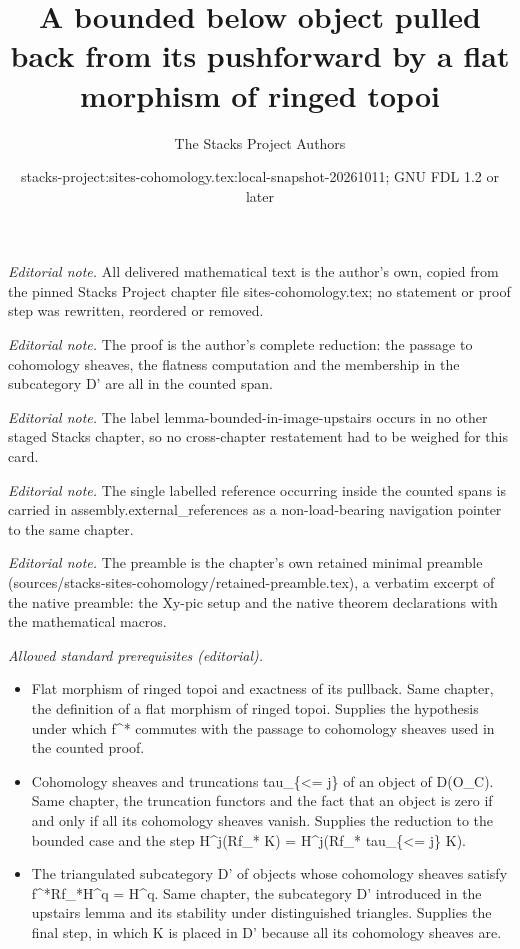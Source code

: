\documentclass[10pt,a4paper]{amsart}
\title{A bounded below object pulled back from its pushforward by a flat morphism of ringed topoi}
\author{The Stacks Project Authors}
\date{stacks-project:sites-cohomology.tex:local-snapshot-20261011; GNU FDL 1.2 or later}
\theoremstyle{plain}
\theoremstyle{definition}
\theoremstyle{remark}
\numberwithin{equation}{subsection}
\begin{document}
\maketitle
\noindent\textit{Editorial note.} All delivered mathematical text is the author's own, copied from the pinned Stacks Project chapter file sites-cohomology.tex; no statement or proof step was rewritten, reordered or removed.\par\medskip
\noindent\textit{Editorial note.} The proof is the author's complete reduction: the passage to cohomology sheaves, the flatness computation and the membership in the subcategory D' are all in the counted span.\par\medskip
\noindent\textit{Editorial note.} The label lemma-bounded-in-image-upstairs occurs in no other staged Stacks chapter, so no cross-chapter restatement had to be weighed for this card.\par\medskip
\noindent\textit{Editorial note.} The single labelled reference occurring inside the counted spans is carried in assembly.external\_references as a non-load-bearing navigation pointer to the same chapter.\par\medskip
\noindent\textit{Editorial note.} The preamble is the chapter's own retained minimal preamble (sources/stacks-sites-cohomology/retained-preamble.tex), a verbatim excerpt of the native preamble: the Xy-pic setup and the native theorem declarations with the mathematical macros.\par\medskip
\noindent\textit{Allowed standard prerequisites (editorial).}\begin{itemize}
\item Flat morphism of ringed topoi and exactness of its pullback. Same chapter, the definition of a flat morphism of ringed topoi. Supplies the hypothesis under which f\textasciicircum{}* commutes with the passage to cohomology sheaves used in the counted proof.
\item Cohomology sheaves and truncations tau\_\{<= j\} of an object of D(O\_C). Same chapter, the truncation functors and the fact that an object is zero if and only if all its cohomology sheaves vanish. Supplies the reduction to the bounded case and the step H\textasciicircum{}j(Rf\_* K) = H\textasciicircum{}j(Rf\_* tau\_\{<= j\} K).
\item The triangulated subcategory D' of objects whose cohomology sheaves satisfy f\textasciicircum{}*Rf\_*H\textasciicircum{}q = H\textasciicircum{}q. Same chapter, the subcategory D' introduced in the upstairs lemma and its stability under distinguished triangles. Supplies the final step, in which K is placed in D' because all its cohomology sheaves are.
\end{itemize}\medskip
\end{document}

